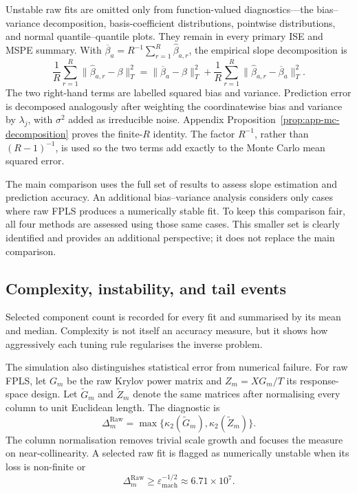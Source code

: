 Unstable raw fits are omitted only from function-valued diagnostics---the bias--variance decomposition,
basis-coefficient distributions, pointwise distributions, and normal
quantile--quantile plots.  They remain in every primary ISE and MSPE summary.
With
$\overline\beta_a=R^{-1}\sum_{r=1}^{R}\widehat\beta_{a,r}$, the empirical
slope decomposition is
\begin{equation}
    \frac1R\sum_{r=1}^{R}
      \|\widehat\beta_{a,r}-\beta\|_T^2
    =\|\overline\beta_a-\beta\|_T^2
     +\frac1R\sum_{r=1}^{R}
       \|\widehat\beta_{a,r}-\overline\beta_a\|_T^2.
    \label{eq:simulation-bias-variance}
\end{equation}
The two right-hand terms are labelled squared bias and variance.  Prediction
error is decomposed analogously after weighting the coordinatewise bias and
variance by $\lambda_j$, with $\sigma^2$ added as irreducible noise.
Appendix Proposition~\ref{prop:app-mc-decomposition} proves the finite-$R$
identity.  The factor $R^{-1}$, rather than $(R-1)^{-1}$, is used so the two
terms add exactly to the Monte Carlo mean squared error.

The main comparison uses the full set of results to assess slope estimation and prediction accuracy. An additional bias–variance analysis considers only cases where raw FPLS produces a numerically stable fit. To keep this comparison fair, all four methods are assessed using those same cases. This smaller set is clearly identified and provides an additional perspective; it does not replace the main comparison.

\subsection{Complexity, instability, and tail events}

Selected component count is recorded for every fit and summarised by its mean
and median.  Complexity is not itself an accuracy measure, but it shows how
aggressively each tuning rule regularises the inverse problem.

The simulation also distinguishes statistical error from numerical failure.
For raw FPLS, let $G_m$ be the raw Krylov power matrix and
$Z_m=XG_m/T$ its response-space design.  Let $\widetilde G_m$ and
$\widetilde Z_m$ denote the same matrices after normalising every column to
unit Euclidean length.  The diagnostic is
\begin{equation}
    \Delta_m^{\mathrm{Raw}}
    =\max\{\kappa_2(\widetilde G_m),\kappa_2(\widetilde Z_m)\}.
    \label{eq:simulation-raw-condition}
\end{equation}
The column normalisation removes trivial scale growth and focuses the measure
on near-collinearity.  A selected raw fit is flagged as numerically unstable
when its loss is non-finite or
\begin{equation}
    \Delta_m^{\mathrm{Raw}}
    \geq\varepsilon_{\mathrm{mach}}^{-1/2}
    \approx 6.71\times10^7.
    \label{eq:simulation-raw-threshold}
\end{equation}

